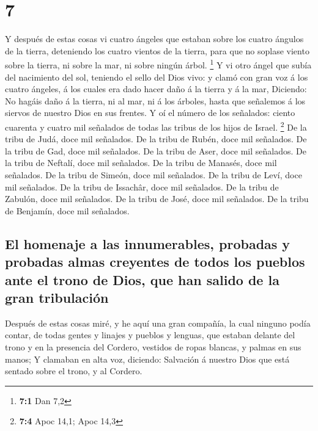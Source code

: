 \hypertarget{section-6}{%
\section{7}\label{section-6}}

 Y después de estas cosas vi cuatro ángeles que estaban
sobre los cuatro ángulos de la tierra, deteniendo los cuatro vientos de
la tierra, para que no soplase viento sobre la tierra, ni sobre la mar,
ni sobre ningún árbol. \footnote{\textbf{7:1} Dan 7,2}  Y
vi otro ángel que subía del nacimiento del sol, teniendo el sello del
Dios vivo: y clamó con gran voz á los cuatro ángeles, á los cuales era
dado hacer daño á la tierra y á la mar,  Diciendo: No
hagáis daño á la tierra, ni al mar, ni á los árboles, hasta que
señalemos á los siervos de nuestro Dios en sus frentes.  Y
oí el número de los señalados: ciento cuarenta y cuatro mil señalados de
todas las tribus de los hijos de Israel. \footnote{\textbf{7:4} Apoc
  14,1; Apoc 14,3}  De la tribu de Judá, doce mil
señalados. De la tribu de Rubén, doce mil señalados. De la tribu de Gad,
doce mil señalados.  De la tribu de Aser, doce mil
señalados. De la tribu de Neftalí, doce mil señalados. De la tribu de
Manasés, doce mil señalados.  De la tribu de Simeón, doce
mil señalados. De la tribu de Leví, doce mil señalados. De la tribu de
Issachâr, doce mil señalados.  De la tribu de Zabulón,
doce mil señalados. De la tribu de José, doce mil señalados. De la tribu
de Benjamín, doce mil señalados.

\hypertarget{el-homenaje-a-las-innumerables-probadas-y-probadas-almas-creyentes-de-todos-los-pueblos-ante-el-trono-de-dios-que-han-salido-de-la-gran-tribulaciuxf3n}{%
\subsection{El homenaje a las innumerables, probadas y probadas almas
creyentes de todos los pueblos ante el trono de Dios, que han salido de
la gran
tribulación}\label{el-homenaje-a-las-innumerables-probadas-y-probadas-almas-creyentes-de-todos-los-pueblos-ante-el-trono-de-dios-que-han-salido-de-la-gran-tribulaciuxf3n}}

 Después de estas cosas miré, y he aquí una gran compañía,
la cual ninguno podía contar, de todas gentes y linajes y pueblos y
lenguas, que estaban delante del trono y en la presencia del Cordero,
vestidos de ropas blancas, y palmas en sus manos;  Y
clamaban en alta voz, diciendo: Salvación á nuestro Dios que está
sentado sobre el trono, y al Cordero.

